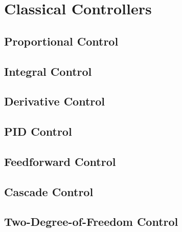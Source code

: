 \chapter{Classical Controllers} \label{ch:classical}

    \section{Proportional Control}

    \section{Integral Control}

    \section{Derivative Control}

    \section{PID Control}

    \section{Feedforward Control}

    \section{Cascade Control}

    \section{Two-Degree-of-Freedom Control}